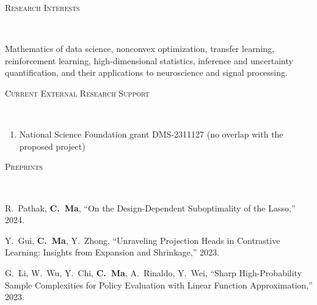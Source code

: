 \documentclass[a4paper, 10pt]{article}
\newenvironment{changemargin}[2]{%
  \begin{list}{}{%
    \setlength{\topsep}{0pt}%
    \setlength{\leftmargin}{#1}%
    \setlength{\rightmargin}{#2}%
    \setlength{\listparindent}{\parindent}%
    \setlength{\itemindent}{\parindent}%
    \setlength{\parsep}{\parskip}%
  }%
  \item[]}{\end{list}
}
\newcommand{\lineover}{
	\begin{changemargin}{-0.05in}{-0.05in}
		\vspace*{-8pt}
		\hrulefill \\
		\vspace*{-2pt}
	\end{changemargin}
}
\newcommand{\header}[1]{
	\begin{changemargin}{-0.5in}{-0.5in}
		\scshape{#1}\\
  	\lineover
	\end{changemargin}
}
\newenvironment{body} {
	\vspace*{-16pt}
	\begin{changemargin}{-0.3in}{-0.5in}
  }	
	{\end{changemargin}
}
\begin{document}
\bigskip
\header{\LARGE{Research Interests}}
\begin{body}
\vspace{18pt}
Mathematics of data science, nonconvex optimization,  transfer learning, reinforcement learning, high-dimensional statistics, inference and uncertainty quantification, and their applications to neuroscience and signal processing.
\end{body}



\bigskip
\header{\LARGE{Current External Research Support}}
\begin{body}
\vspace{18pt}
\begin{enumerate}
	\item National Science Foundation grant DMS-2311127 (no overlap with the proposed project)
\end{enumerate}
\end{body}



\bigskip
\header{\LARGE{Preprints}}
\begin{body}
	\vspace{18pt}
	\begin{enumerate}[label={[{P}{{\arabic*}}]}]

\item R.~Pathak, \textbf{C.~Ma}, ``On the Design-Dependent Suboptimality of the Lasso,'' 2024.
\item Y.~Gui, \textbf{C.~Ma}, Y.~Zhong, ``Unraveling Projection Heads in Contrastive Learning: Insights from Expansion and Shrinkage,'' 2023.
\item G.~Li, W.~Wu, Y.~Chi, \textbf{C.~Ma}, A.~Rinaldo, Y.~Wei, ``Sharp High-Probability Sample Complexities for Policy Evaluation with Linear Function Approximation,'' 2023.










	\end{enumerate}
\end{body}
\end{document}
